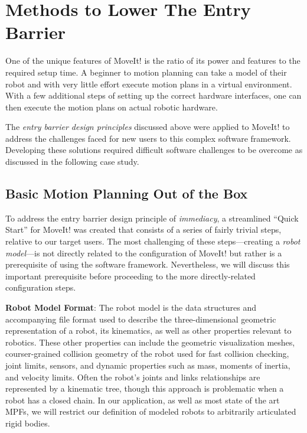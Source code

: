 \documentclass[10pt,journal,compsoc]{joser1}
\begin{document}
{%
\section{Methods to Lower The Entry Barrier}
\label{sec::lowering_barriers}

One of the unique features of MoveIt! is the ratio of its power and features to the required setup time. A beginner to motion planning can take a model of their robot and with very little effort execute motion plans in a virtual environment. With a few additional steps of setting up the correct hardware interfaces, one can then execute the motion plans on actual robotic hardware.

The \textit{entry barrier design principles} discussed above were applied to MoveIt! to address the challenges faced for new users to this complex software framework. Developing these solutions required difficult software challenges to be overcome as discussed in the following case study.

\subsection{Basic Motion Planning Out of the Box}

To address the entry barrier design principle of \textit{immediacy}, a streamlined ``Quick Start'' for MoveIt! was created that consists of a series of fairly trivial steps, relative to our target users. The most challenging of these steps---creating a \textit{robot model}---is not directly related to the configuration of MoveIt! but rather is a prerequisite of using the software framework. Nevertheless, we will discuss this important prerequisite before proceeding to the more directly-related configuration steps.

{\bf Robot Model Format}: The robot model is the data structures and accompanying file format used to describe the three-dimensional geometric representation of a robot, its kinematics, as well as other properties relevant to robotics. These other properties can include the geometric visualization meshes, courser-grained collision geometry of the robot used for fast collision checking, joint limits, sensors, and dynamic properties such as mass, moments of inertia, and velocity limits. Often the robot's joints and links relationships are represented by a kinematic tree, though this approach is problematic when a robot has a closed chain. In our application, as well as most state of the art MPFs, we will restrict our definition of modeled robots to arbitrarily articulated rigid bodies. 

}
\end{document}
